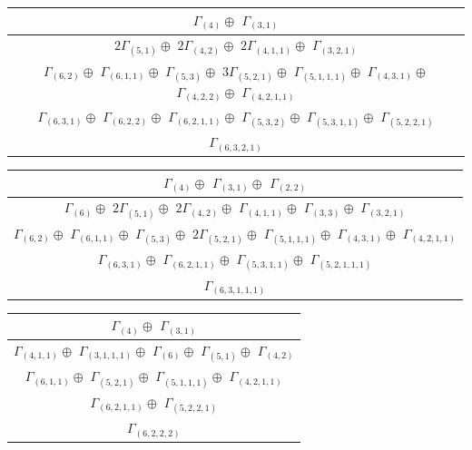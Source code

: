 \documentclass[main.tex]{subfiles}
\begin{document}
\bigskip
\begin{minipage}{1\textwidth}
\centering
\begin{tabular}{c}
$\Gamma_{(
4
)} \oplus$
$\Gamma_{(
3 , 
1
)}$
\\ \hline
$ 2 \Gamma_{(
5 , 
1
)} \oplus$
$ 2 \Gamma_{(
4 , 
2
)} \oplus$
$ 2 \Gamma_{(
4 , 
1 , 
1
)} \oplus$
$\Gamma_{(
3 , 
2 , 
1
)}$
\\ \hline
$\Gamma_{(
6 , 
2
)} \oplus$
$\Gamma_{(
6 , 
1 , 
1
)} \oplus$
$\Gamma_{(
5 , 
3
)} \oplus$
$ 3 \Gamma_{(
5 , 
2 , 
1
)} \oplus$
$\Gamma_{(
5 , 
1 , 
1 , 
1
)} \oplus$
$\Gamma_{(
4 , 
3 , 
1
)} \oplus$
$\Gamma_{(
4 , 
2 , 
2
)} \oplus$
$\Gamma_{(
4 , 
2 , 
1 , 
1
)}$
\\ \hline
$\Gamma_{(
6 , 
3 , 
1
)} \oplus$
$\Gamma_{(
6 , 
2 , 
2
)} \oplus$
$\Gamma_{(
6 , 
2 , 
1 , 
1
)} \oplus$
$\Gamma_{(
5 , 
3 , 
2
)} \oplus$
$\Gamma_{(
5 , 
3 , 
1 , 
1
)} \oplus$
$\Gamma_{(
5 , 
2 , 
2 , 
1
)}$
\\ \hline
$\Gamma_{(
6 , 
3 , 
2 , 
1
)}$
\\
\end{tabular}\end{minipage}
\bigskip
\begin{minipage}{1\textwidth}
\centering
\begin{tabular}{c}
$\Gamma_{(
4
)} \oplus$
$\Gamma_{(
3 , 
1
)} \oplus$
$\Gamma_{(
2 , 
2
)}$
\\ \hline
$\Gamma_{(
6
)} \oplus$
$ 2 \Gamma_{(
5 , 
1
)} \oplus$
$ 2 \Gamma_{(
4 , 
2
)} \oplus$
$\Gamma_{(
4 , 
1 , 
1
)} \oplus$
$\Gamma_{(
3 , 
3
)} \oplus$
$\Gamma_{(
3 , 
2 , 
1
)}$
\\ \hline
$\Gamma_{(
6 , 
2
)} \oplus$
$\Gamma_{(
6 , 
1 , 
1
)} \oplus$
$\Gamma_{(
5 , 
3
)} \oplus$
$ 2 \Gamma_{(
5 , 
2 , 
1
)} \oplus$
$\Gamma_{(
5 , 
1 , 
1 , 
1
)} \oplus$
$\Gamma_{(
4 , 
3 , 
1
)} \oplus$
$\Gamma_{(
4 , 
2 , 
1 , 
1
)}$
\\ \hline
$\Gamma_{(
6 , 
3 , 
1
)} \oplus$
$\Gamma_{(
6 , 
2 , 
1 , 
1
)} \oplus$
$\Gamma_{(
5 , 
3 , 
1 , 
1
)} \oplus$
$\Gamma_{(
5 , 
2 , 
1 , 
1 , 
1
)}$
\\ \hline
$\Gamma_{(
6 , 
3 , 
1 , 
1 , 
1
)}$
\\
\end{tabular}\end{minipage}
\bigskip
\begin{minipage}{1\textwidth}
\centering
\begin{tabular}{c}
$\Gamma_{(
4
)} \oplus$
$\Gamma_{(
3 , 
1
)}$
\\ \hline
$\Gamma_{(
4 , 
1 , 
1
)} \oplus$
$\Gamma_{(
3 , 
1 , 
1 , 
1
)} \oplus$
$\Gamma_{(
6
)} \oplus$
$\Gamma_{(
5 , 
1
)} \oplus$
$\Gamma_{(
4 , 
2
)}$
\\ \hline
$\Gamma_{(
6 , 
1 , 
1
)} \oplus$
$\Gamma_{(
5 , 
2 , 
1
)} \oplus$
$\Gamma_{(
5 , 
1 , 
1 , 
1
)} \oplus$
$\Gamma_{(
4 , 
2 , 
1 , 
1
)}$
\\ \hline
$\Gamma_{(
6 , 
2 , 
1 , 
1
)} \oplus$
$\Gamma_{(
5 , 
2 , 
2 , 
1
)}$
\\ \hline
$\Gamma_{(
6 , 
2 , 
2 , 
2
)}$
\\
\end{tabular}\end{minipage}
\end{document}
